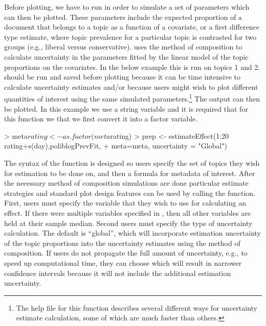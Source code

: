 \documentclass[nojss]{jss}
\begin{document}
Before plotting, we have to run  in order to simulate a set of parameters which can then be plotted. These parameters include the expected proportion of a document that belongs to a topic as a function of a covariate, or a first difference type estimate, where topic prevalence for a particular topic is contrasted for two groups (e.g., liberal versus conservative).  uses the method of composition to calculate uncertainty in the parameters fitted by the linear model of the topic proportions on the covariates.  In the below example this is run on topics 1 and 2.  should be run and saved before plotting because it can be time intensive to calculate uncertainty estimates and/or because users might wish to plot different quantities of interest using the same simulated parameters.\footnote{The help file for this function describes several different ways for uncertainty estimate calculation, some of which are much faster than others.} The output can then be plotted. In this example we use a string variable and it is required that for this function we that we first convert it into a factor variable.

\begin{Schunk}
\begin{Sinput}
> meta$rating<-as.factor(meta$rating)
> prep <- estimateEffect(1:20 ~ rating+s(day),poliblogPrevFit,
+          meta=meta, uncertainty = "Global")
\end{Sinput}
\end{Schunk}

The syntax of the  function is designed so users specify the set of topics they wish for estimation to be done on, and then a formula for metadata of interest. After the necessary method of composition simulations are done particular estimate strategies and standard plot design features can be used by calling the  function. First, users must specify the variable that they wish to use for calculating an effect. If there were multiple variables specified in , then all other variables are held at their sample median. Second users must specify the type of uncertainty calculation. The default is ``global'', which will incorporate estimation uncertainty of the topic proportions into the uncertainty estimates using the method of composition. If users do not propagate the full amount of uncertainty, e.g., to  speed up computational time, they can choose  which will result in narrower confidence intervals because it will not include the additional estimation uncertainty.
\end{document}
